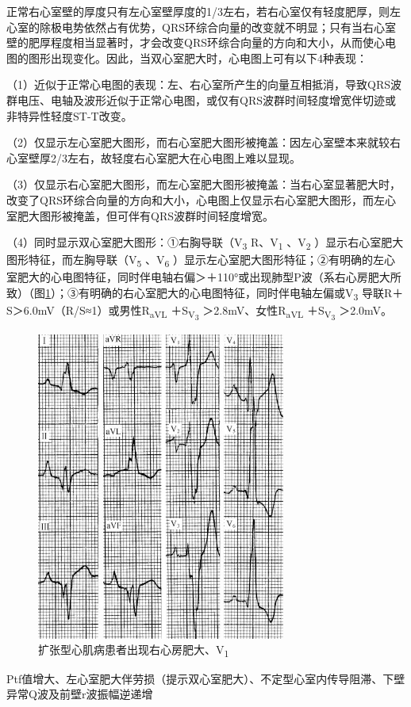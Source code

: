 正常右心室壁的厚度只有左心室壁厚度的1/3左右，若右心室仅有轻度肥厚，则左心室的除极电势依然占有优势，QRS环综合向量的改变就不明显；只有当右心室壁的肥厚程度相当显著时，才会改变QRS环综合向量的方向和大小，从而使心电图的图形出现变化。因此，当双心室肥大时，心电图上可有以下4种表现：

（1）近似于正常心电图的表现：左、右心室所产生的向量互相抵消，导致QRS波群电压、电轴及波形近似于正常心电图，或仅有QRS波群时间轻度增宽伴切迹或非特异性轻度ST-T改变。

（2）仅显示左心室肥大图形，而右心室肥大图形被掩盖：因左心室壁本来就较右心室壁厚2/3左右，故轻度右心室肥大在心电图上难以显现。

（3）仅显示右心室肥大图形，而左心室肥大图形被掩盖：当右心室显著肥大时，改变了QRS环综合向量的方向和大小，心电图上仅显示右心室肥大图形，而左心室肥大图形被掩盖，但可伴有QRS波群时间轻度增宽。

（4）同时显示双心室肥大图形：①右胸导联（V\textsubscript{3}
R、V\textsubscript{1} 、V\textsubscript{2}
）显示右心室肥大图形特征，而左胸导联（V\textsubscript{5}
、V\textsubscript{6}
）显示左心室肥大图形特征；②有明确的左心室肥大的心电图特征，同时伴电轴右偏＞＋110°或出现肺型P波（系右心房肥大所致）（图\ref{fig36-12}）；③有明确的右心室肥大的心电图特征，同时伴电轴左偏或V\textsubscript{3}
导联R＋S＞6.0mV（R/S≈1）或男性R\textsubscript{aVL}
＋S\textsubscript{V\textsubscript{3}} ＞2.8mV、女性R\textsubscript{aVL}
＋S\textsubscript{V\textsubscript{3}} ＞2.0mV。

\begin{figure}[!htbp]
 \centering
 \includegraphics[width=3.21875in,height=4in]{./images/Image00584.jpg}
 \captionsetup{justification=centering}
 \caption{扩张型心肌病患者出现右心房肥大、V\textsubscript{1}}
 \label{fig36-12}
  \end{figure} 
Ptf值增大、左心室肥大伴劳损（提示双心室肥大）、不定型心室内传导阻滞、下壁异常Q波及前壁r波振幅逆递增

